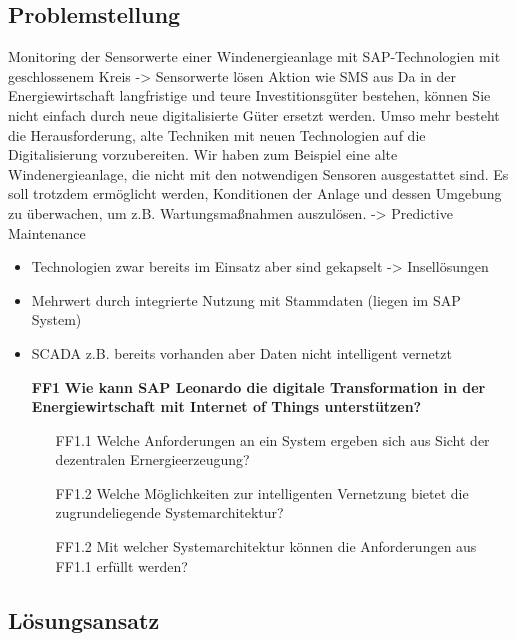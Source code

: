 \subsection{Problemstellung} \label{problemstellung}
Monitoring der Sensorwerte einer Windenergieanlage mit SAP-Technologien mit geschlossenem Kreis -> Sensorwerte lösen Aktion wie SMS aus
\newline
Da in der Energiewirtschaft langfristige und teure Investitionsgüter bestehen, können Sie nicht einfach durch neue
digitalisierte Güter ersetzt werden. Umso mehr besteht die Herausforderung, alte Techniken mit neuen Technologien
auf die Digitalisierung vorzubereiten. Wir haben zum Beispiel eine alte Windenergieanlage, die nicht mit den
notwendigen Sensoren ausgestattet sind. Es soll trotzdem ermöglicht werden, Konditionen der Anlage und dessen Umgebung
zu überwachen, um z.B. Wartungsmaßnahmen auszulösen. -> Predictive Maintenance

\begin{itemize}
  \item Technologien zwar bereits im Einsatz aber sind gekapselt -> Insellösungen
  \item Mehrwert durch integrierte Nutzung mit Stammdaten (liegen im SAP System)
  \item SCADA z.B. bereits vorhanden aber Daten nicht intelligent vernetzt
\end{itemize}


\begin{itemize}
  \item[\textbf{FF1}] \textbf{Wie kann SAP Leonardo die digitale Transformation in der Energiewirtschaft mit Internet of Things unterstützen?}
  \begin{itemize}
    \item[FF1.1] Welche Anforderungen an ein System ergeben sich aus Sicht der dezentralen Ernergieerzeugung?
    \item[FF1.2] Welche Möglichkeiten zur intelligenten Vernetzung bietet die zugrundeliegende Systemarchitektur?
    \item[FF1.2] Mit welcher Systemarchitektur können die Anforderungen aus FF1.1 erfüllt werden?
  \end{itemize}
\end{itemize}

\subsection{Lösungsansatz}

